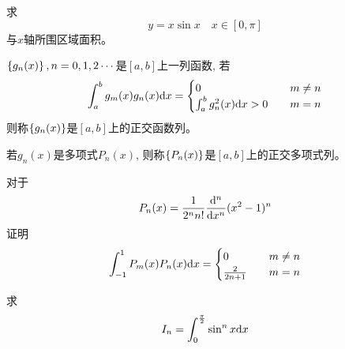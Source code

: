 \begin{example}
    求
    \begin{equation*}
        y = x\sin x \quad x \in [0, \pi]
    \end{equation*}
    与$x$轴所围区域面积。
\end{example}
\begin{solution}
    
\end{solution}

\begin{definition}
    $\left\{ g_n(x)\right\}, n = 0, 1, 2 \cdots$是$[a, b]$上一列函数, 若
    \begin{equation*}
        \int_a^b g_m(x) g_n(x) \mathrm{d} x = \begin{cases}
            0 &\quad m \neq n \\
            \int_a^b g_n^2(x) \mathrm{d} x > 0 &\quad m = n 
        \end{cases}
    \end{equation*}
    则称$\left\{ g_n(x)\right\}$是$[a, b]$上的正交函数列。

    若$g_n(x)$是多项式$P_n(x)$, 则称$\left\{ P_n(x)\right\}$是$[a, b]$上的正交多项式列。
\end{definition}

\begin{example}[Lagandre多项式]
    对于
    \begin{equation*}
        P_n(x) = \frac{1}{2^n n!}\frac{\mathrm{d}^n}{\mathrm{d} x^n}(x^2-1)^n
    \end{equation*}
    证明
    \begin{equation*}
        \int_{-1}^1 P_m(x)P_n(x) \mathrm{d} x = \begin{cases}
            0 &\quad m \neq n \\
            \frac{2}{2n+1} &\quad m = n
        \end{cases}
    \end{equation*}
\end{example}
\begin{solution}
    
\end{solution}

\begin{example}\label{example-chapter7-1}
    求
    \begin{equation*}
        I_n = \int_0^{\frac{\pi}{2}} \sin^n x \mathrm{d} x
    \end{equation*}
\end{example}
\begin{solution}
    
\end{solution}

